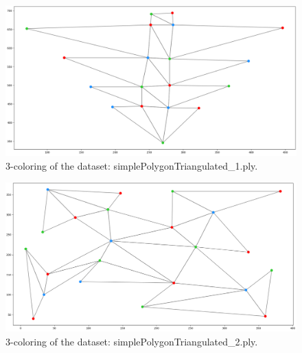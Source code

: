 \documentclass[english, fontsize=12pt, paper=a4, twoside=false, draft=true, pagesize=auto, version=last, DIV=16]{scrartcl}
\theoremstyle{break}
\begin{document}
\begin{figure}[h!]
\centering
\includegraphics[width=\textwidth]{images/Figure_1.png}
\caption{3-coloring of the dataset: simplePolygonTriangulated\_1.ply.}
\label{fig:task_1_b}
\end{figure}
\vspace*{15mm}

\begin{figure}[h!]
\centering
\includegraphics[width=\textwidth]{images/Figure_2.png}
\caption{3-coloring of the dataset: simplePolygonTriangulated\_2.ply.}
\label{fig:task_1_b}
\end{figure}



% 
% 
	
\printbibliography
%
\end{document}

